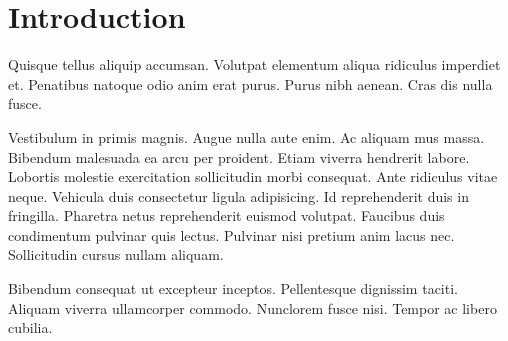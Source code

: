 \chapter{Introduction}

Quisque tellus aliquip accumsan. Volutpat elementum aliqua ridiculus imperdiet et. Penatibus natoque odio anim erat purus. Purus nibh aenean. Cras dis nulla fusce.

Vestibulum in primis magnis. Augue nulla aute enim. Ac aliquam mus massa. Bibendum malesuada ea arcu per proident. Etiam viverra hendrerit labore.
Lobortis molestie exercitation sollicitudin morbi consequat. Ante ridiculus vitae neque. Vehicula duis consectetur ligula adipisicing. Id reprehenderit duis in fringilla. Pharetra netus reprehenderit euismod volutpat.
Faucibus duis condimentum pulvinar quis lectus. Pulvinar nisi pretium anim lacus nec. Sollicitudin cursus nullam aliquam.

Bibendum consequat ut excepteur inceptos. Pellentesque dignissim taciti. Aliquam viverra ullamcorper commodo. Nunclorem fusce nisi. Tempor ac libero cubilia.
